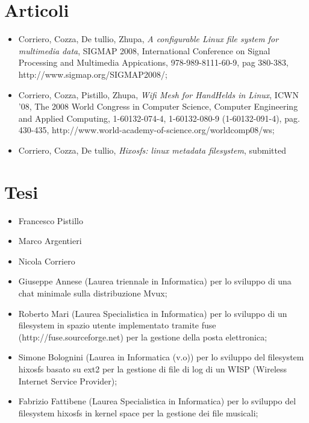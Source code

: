\documentclass[a4paper,12pt]{article}
\begin{document}
\section*{Articoli}
\begin{itemize}
\item Corriero, Cozza, De tullio, Zhupa, \textit{A configurable Linux file system for multimedia data}, SIGMAP 2008, International Conference on Signal Processing and Multimedia Appications, 978-989-8111-60-9, pag 380-383, \\http://www.sigmap.org/SIGMAP2008/;
\item Corriero, Cozza, Pistillo, Zhupa, \textit{Wifi Mesh for HandHelds in Linux}, ICWN '08, The 2008 World Congress in Computer Science, Computer Engineering and Applied Computing, 1-60132-074-4, 1-60132-080-9 (1-60132-091-4), pag. 430-435, http://www.world-academy-of-science.org/worldcomp08/ws;
\item Corriero, Cozza, De tullio, \textit{Hixosfs: linux metadata filesystem}, submitted
\end{itemize}


\section*{Tesi}
\begin{itemize}
\item Francesco Pistillo
\item Marco Argentieri
\item Nicola Corriero
 \item Giuseppe Annese (Laurea triennale in Informatica) per lo sviluppo di una chat minimale sulla distribuzione Mvux;
\item Roberto Mari (Laurea Specialistica in Informatica) per lo sviluppo di un filesystem in spazio utente implementato tramite fuse \\(http://fuse.sourceforge.net) per la gestione della posta elettronica;
\item Simone Bolognini (Laurea in Informatica  (v.o)) per lo sviluppo del filesystem hixosfs basato su ext2 per la gestione di file di log di un WISP (Wireless Internet Service Provider);
\item Fabrizio Fattibene (Laurea Specialistica in Informatica) per lo sviluppo del filesystem hixosfs in kernel space per la gestione dei file musicali;
\end{itemize}
\end{document}
